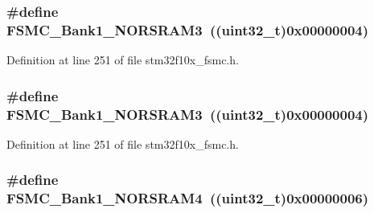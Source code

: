 \subsubsection[{\texorpdfstring{F\+S\+M\+C\+\_\+\+Bank1\+\_\+\+N\+O\+R\+S\+R\+A\+M3}{FSMC_Bank1_NORSRAM3}}]{\setlength{\rightskip}{0pt plus 5cm}\#define F\+S\+M\+C\+\_\+\+Bank1\+\_\+\+N\+O\+R\+S\+R\+A\+M3~(({\bf uint32\+\_\+t})0x00000004)}\hypertarget{group___f_s_m_c___n_o_r_s_r_a_m___bank_ga151b02506a318ac77382b52f3b5e16f4}{}\label{group___f_s_m_c___n_o_r_s_r_a_m___bank_ga151b02506a318ac77382b52f3b5e16f4}


Definition at line 251 of file stm32f10x\+\_\+fsmc.\+h.

\subsubsection[{\texorpdfstring{F\+S\+M\+C\+\_\+\+Bank1\+\_\+\+N\+O\+R\+S\+R\+A\+M3}{FSMC_Bank1_NORSRAM3}}]{\setlength{\rightskip}{0pt plus 5cm}\#define F\+S\+M\+C\+\_\+\+Bank1\+\_\+\+N\+O\+R\+S\+R\+A\+M3~(({\bf uint32\+\_\+t})0x00000004)}\hypertarget{group___f_s_m_c___n_o_r_s_r_a_m___bank_ga151b02506a318ac77382b52f3b5e16f4}{}\label{group___f_s_m_c___n_o_r_s_r_a_m___bank_ga151b02506a318ac77382b52f3b5e16f4}


Definition at line 251 of file stm32f10x\+\_\+fsmc.\+h.

\subsubsection[{\texorpdfstring{F\+S\+M\+C\+\_\+\+Bank1\+\_\+\+N\+O\+R\+S\+R\+A\+M4}{FSMC_Bank1_NORSRAM4}}]{\setlength{\rightskip}{0pt plus 5cm}\#define F\+S\+M\+C\+\_\+\+Bank1\+\_\+\+N\+O\+R\+S\+R\+A\+M4~(({\bf uint32\+\_\+t})0x00000006)}\hypertarget{group___f_s_m_c___n_o_r_s_r_a_m___bank_ga1083572834aa084d21e6698c280f8f74}{}\label{group___f_s_m_c___n_o_r_s_r_a_m___bank_ga1083572834aa084d21e6698c280f8f74}


